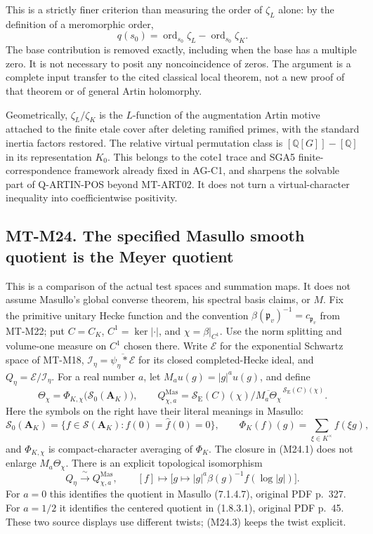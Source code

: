 \documentclass[11pt,a4paper]{article}
\begin{document}
This is a strictly finer criterion than measuring the order
of $\zeta_L$ alone: by the definition of a meromorphic order,
\[
 q(s_0)=\operatorname{ord}_{s_0}\zeta_L
                 -\operatorname{ord}_{s_0}\zeta_K.
\]
The base contribution is removed exactly, including when the
base has a multiple zero. It is not necessary to posit any
noncoincidence of zeros. The argument is a complete input
transfer to the cited classical local theorem, not a new proof
of that theorem or of general Artin holomorphy.

Geometrically, $\zeta_L/\zeta_K$ is the $L$-function of the
augmentation Artin motive attached to the finite etale cover
after deleting ramified primes, with the standard inertia
factors restored. The relative virtual permutation class is
$[\mathbb Q[G]]-[\mathbb Q]$ in its representation $K_0$.
This belongs to the cote1 trace and SGA5 finite-correspondence
framework already fixed in AG-C1, and sharpens the
solvable part of Q-ARTIN-POS beyond MT-ART02. It does not turn a
virtual-character inequality into coefficientwise positivity.


\subsection*{MT-M24. The specified Masullo smooth quotient is the Meyer quotient}
This is a comparison of the actual test spaces and summation maps. It does
not assume Masullo's global converse theorem, his spectral basis claims,
or $M$. Fix the primitive unitary Hecke function and the convention
$\beta(\mathfrak p_v)^{-1}=c_{\mathfrak p_v}$ from MT-M22; put
$C=C_K$, $C^1=\ker|\cdot|$, and $\chi=\beta|_{C^1}$.
Use the norm splitting and volume-one measure on $C^1$ chosen there.
Write $\mathcal E$ for the exponential Schwartz space of MT-M18,
$\mathcal I_\eta=\overline{\psi_\eta*\mathcal E}$ for its closed
completed-Hecke ideal, and $Q_\eta=\mathcal E/\mathcal I_\eta$.
For a real number $a$, let $M_a u(g)=|g|^a u(g)$, and define
\[
 \Theta_\chi=\Phi_{K,\chi}\bigl(\mathcal S_0(\mathbf A_K)\bigr),
 \qquad
 Q^{\mathrm{Mas}}_{\chi,a}
 =\mathcal S_{\mathrm E}(C)(\chi)\big/
       \overline{M_a\Theta_\chi}^{\,\mathcal S_{\mathrm E}(C)(\chi)}.
 \tag{M24.1}
\]
Here the symbols on the right have their literal meanings in Masullo:
\[
 \mathcal S_0(\mathbf A_K)
  =\{f\in\mathcal S(\mathbf A_K):f(0)=\widehat f(0)=0\},
 \qquad
 \Phi_K(f)(g)=\sum_{\xi\in K^\times}f(\xi g),
 \tag{M24.2}
\]
and $\Phi_{K,\chi}$ is compact-character averaging of $\Phi_K$.
The closure in (M24.1) does not enlarge $M_a\Theta_\chi$.
There is an explicit topological isomorphism
\[
 Q_\eta\xrightarrow{\ \sim\ }Q^{\mathrm{Mas}}_{\chi,a},
 \qquad
 [f]\longmapsto
 \bigl[g\longmapsto |g|^a\beta(g)^{-1}f(\log|g|)\bigr].
 \tag{M24.3}
\]
For $a=0$ this identifies the quotient in Masullo (7.1.4.7),
original PDF p.~327. For $a=1/2$ it identifies the centered quotient
in (1.8.3.1), original PDF p.~45. These two source displays use
different twists; (M24.3) keeps the twist explicit.
\end{document}
